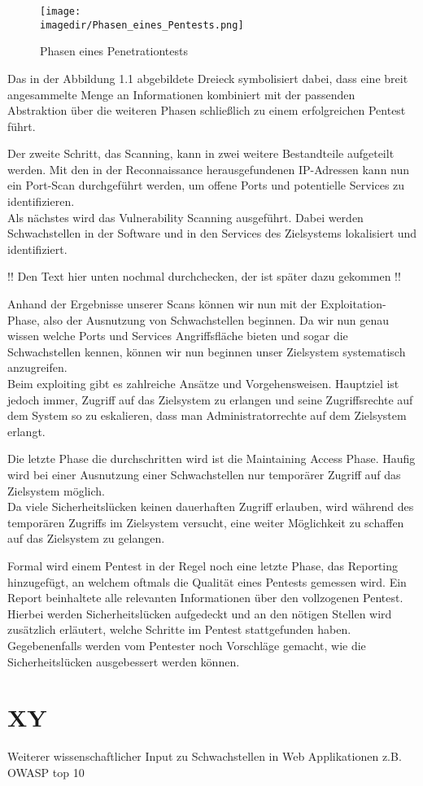 \begin{figure}[H]
	\centering
	\texttt{[image: \\imagedir/Phasen\_eines\_Pentests.png]}
	\caption{Phasen eines Penetrationtests}
	\label{Phasen eines Penetrationtests} \cite{B1}
\end{figure}

Das in der Abbildung 1.1 abgebildete Dreieck symbolisiert dabei, dass eine breit angesammelte Menge an Informationen kombiniert mit der passenden Abstraktion über die weiteren Phasen schließlich zu einem erfolgreichen Pentest führt. 

Der zweite Schritt, das Scanning, kann in zwei weitere Bestandteile aufgeteilt werden. Mit den in der Reconnaissance herausgefundenen IP-Adressen kann nun ein Port-Scan durchgeführt werden, um offene Ports und potentielle Services zu identifizieren. \cite{B2} \\
Als nächstes wird das Vulnerability Scanning ausgeführt. Dabei werden Schwachstellen in der Software und in den Services des Zielsystems lokalisiert und identifiziert. \cite{B3}

!! Den Text hier unten nochmal durchchecken, der ist später dazu gekommen !!

Anhand der Ergebnisse unserer Scans können wir nun mit der Exploitation-Phase, also der Ausnutzung von Schwachstellen beginnen. 
Da wir nun genau wissen welche Ports und Services Angriffsfläche bieten und sogar die Schwachstellen kennen, können wir nun beginnen unser Zielsystem systematisch anzugreifen. \cite{B1}\\
Beim exploiting gibt es zahlreiche Ansätze und Vorgehensweisen. Hauptziel ist jedoch immer, Zugriff auf das Zielsystem zu erlangen und seine Zugriffsrechte auf dem System so zu eskalieren, dass man Administratorrechte auf dem Zielsystem erlangt. \cite{B4}

Die letzte Phase die durchschritten wird ist die Maintaining Access Phase. Haufig wird bei einer Ausnutzung einer Schwachstellen nur temporärer Zugriff auf das Zielsystem möglich. \\
Da viele Sicherheitslücken keinen dauerhaften Zugriff erlauben, wird während des temporären Zugriffs im Zielsystem versucht, eine weiter Möglichkeit zu schaffen auf das Zielsystem zu gelangen. \cite{6}

Formal wird einem Pentest in der Regel noch eine letzte Phase, das Reporting hinzugefügt, an welchem oftmals die Qualität eines Pentests gemessen wird.
Ein Report beinhaltete alle relevanten Informationen über den vollzogenen Pentest. 
Hierbei werden Sicherheitslücken aufgedeckt und an den nötigen Stellen wird zusätzlich erläutert, welche Schritte im Pentest stattgefunden haben. 
Gegebenenfalls werden vom Pentester noch Vorschläge gemacht, wie die Sicherheitslücken ausgebessert werden können. \cite{B1}

\section{XY}

Weiterer wissenschaftlicher Input zu Schwachstellen in Web Applikationen z.B. OWASP top 10


